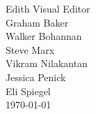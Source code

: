 \documentclass[a4paper, 10pt, oneside]{article}
\begin{document}
\begin{titlepage}
    \vspace*{75pt} %
    \begin{center}
    	{\Huge Edith Visual Editor}\\ [1cm]	%
		{\Large Graham Baker\\
Walker Bohannan\\
Steve Marx    \\
Vikram Nilakantan\\
Jessica Penick\\
Eli Spiegel
}\\[0.5cm]
		\today %
	\end{center}
	\vspace*{\fill}
\end{titlepage}
\end{document}
